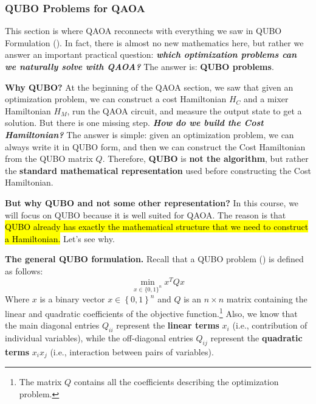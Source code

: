 \subsubsection{QUBO Problems for QAOA}\label{sec:qubo-problems-for-qaoa}

This section is where QAOA reconnects with everything we saw in QUBO Formulation (). In fact, there is almost no new mathematics here, but rather we answer an important practical question: \emph{\textbf{which optimization problems can we naturally solve with QAOA?}} The answer is: \textbf{QUBO problems}.

\highspace
\textcolor{Green3}{ \textbf{Why QUBO?}} At the beginning of the QAOA section, we saw that given an optimization problem, we can construct a cost Hamiltonian $H_C$ and a mixer Hamiltonian $H_M$, run the QAOA circuit, and measure the output state to get a solution. But there is one missing step. \emph{\textbf{How do we build the Cost Hamiltonian?}} The answer is simple: given an optimization problem, we can always write it in QUBO form, and then we can construct the Cost Hamiltonian from the QUBO matrix $Q$. Therefore, \textbf{QUBO} is \textbf{not the algorithm}, but rather the \textbf{standard mathematical representation} used before constructing the Cost Hamiltonian.

\highspace
\textcolor{Green3}{ \textbf{But why QUBO and not some other representation?}} In this course, we will focus on QUBO because it is well suited for QAOA. The reason is that \hl{QUBO already has exactly the mathematical structure that we need to construct a Hamiltonian.} Let's see why.

\highspace
\textcolor{Green3}{ \textbf{The general QUBO formulation.}} Recall that a QUBO problem () is defined as follows:
\begin{equation*}
    \min_{x\in\{0,1\}^n} x^T Q x
\end{equation*}
Where $x$ is a binary vector $x \in \left\{0,1\right\}^n$ and $Q$ is an $n \times n$ matrix containing the linear and quadratic coefficients of the objective function.\footnote{%
    The matrix $Q$ contains all the coefficients describing the optimization problem.
} Also, we know that the main diagonal entries $Q_{ii}$ represent the \textbf{linear terms} $x_i$ (i.e., contribution of individual variables), while the off-diagonal entries $Q_{ij}$ represent the \textbf{quadratic terms} $x_i x_j$ (i.e., interaction between pairs of variables).

